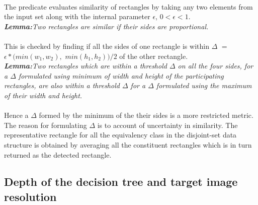 \paragraph{}
The predicate evaluates similarity of rectangles by taking any two elements from the input set along with the internal parameter $\epsilon$, $0 < \epsilon < 1$. \\

\setlength\parindent{24pt}
\textit{\textbf{Lemma:}}\textit{Two rectangles are similar if their sides are proportional.} 

\paragraph{}
This is checked by finding if all the sides of one rectangle is within $\Delta$ $=$ $\epsilon * (min(w_1, w_2),$ $min(h_1, h_2)) / 2$ of the other rectangle. \\

\setlength\parindent{24pt}
\textit{\textbf{Lemma:}}\textit{Two rectangles which are within a threshold $\Delta$ on all the four sides, for a $\Delta$ formulated using \textit{minimum} of width and height of the participating rectangles, are also within a threshold $\Delta$ for a $\Delta$ formulated using the maximum of their width and height.} 

\paragraph{}
Hence a $\Delta$ formed by the minimum of the their sides is a more restricted metric. The reason for formulating $\Delta$ is to account of uncertainty in similarity. The representative rectangle for all the equivalency class in the disjoint-set data structure is obtained by averaging all the constituent rectangles which is in turn returned as the detected rectangle. 

\subsection{Depth of the decision tree and target image resolution}


